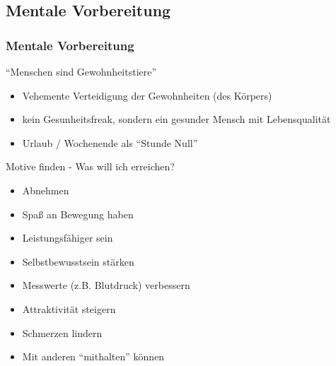 \documentclass[xcolor=dvipsnames]{beamer}
\begin{document}
    \subsection{Mentale Vorbereitung}
    \begin{frame}[allowframebreaks]
        \frametitle{Mentale Vorbereitung}

        \begin{block}{"`Menschen sind Gewohnheitstiere"'}
            \begin{itemize}
                \setlength\itemsep{1em}
                \item Vehemente Verteidigung der Gewohnheiten (des Körpers)
                \item kein Gesunheitsfreak, sondern ein gesunder Mensch mit Lebensqualität
                \item Urlaub / Wochenende als "`Stunde Null"'
            \end{itemize}
        \end{block}

        \framebreak

        \begin{block}{Motive finden -  Was will ich erreichen?}
            \begin{itemize}
                \setlength\itemsep{1em}
                \item Abnehmen
                \item Spaß an Bewegung haben
                \item Leistungsfähiger sein
                \item Selbstbewusstsein stärken
                \item Messwerte (z.B. Blutdruck) verbessern
                \item Attraktivität steigern
                \item Schmerzen lindern
                \item Mit anderen "`mithalten"' können
            \end{itemize}
        \end{block}

    \end{frame}
\end{document}
